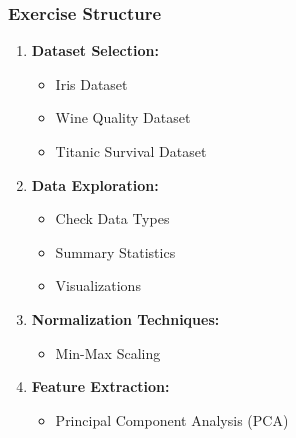 \documentclass[aspectratio=169]{beamer}
\begin{document}
\begin{frame}[fragile]
    \frametitle{Exercise Structure}
    \begin{enumerate}
        \item \textbf{Dataset Selection:}
        \begin{itemize}
            \item Iris Dataset
            \item Wine Quality Dataset
            \item Titanic Survival Dataset
        \end{itemize}
        
        \item \textbf{Data Exploration:}
        \begin{itemize}
            \item Check Data Types
            \item Summary Statistics
            \item Visualizations
        \end{itemize}
        
        \item \textbf{Normalization Techniques:}
        \begin{itemize}
            \item Min-Max Scaling
        \end{itemize}
        
        \item \textbf{Feature Extraction:}
        \begin{itemize}
            \item Principal Component Analysis (PCA)
        \end{itemize}
    \end{enumerate}
\end{frame}
\end{document}
